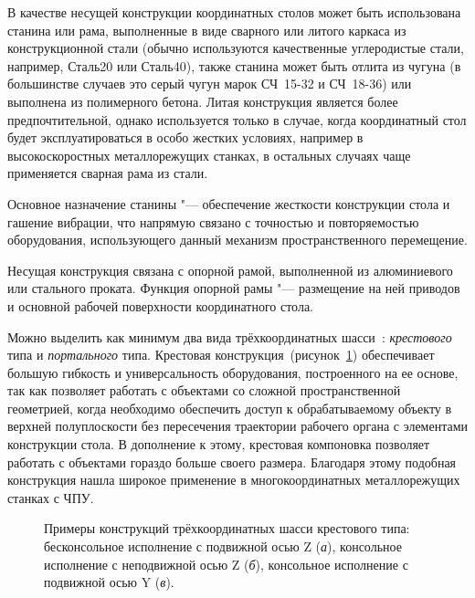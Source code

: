 В качестве несущей конструкции координатных столов может быть использована станина или рама, выполненные в виде сварного или литого каркаса из конструкционной стали (обычно используются качественные углеродистые стали, например, Сталь20 или Сталь40), также станина может быть отлита из чугуна (в большинстве случаев это серый чугун марок СЧ~15-32 и СЧ~18-36) или выполнена из полимерного бетона. Литая конструкция является более предпочтительной, однако используется только в случае, когда координатный стол будет эксплуатироваться в особо жестких условиях, например в высокоскоростных металлорежущих станках, в остальных случаях чаще применяется сварная рама из стали.

Основное назначение станины "--- обеспечение жесткости конструкции стола и гашение вибрации, что напрямую связано с точностью и повторяемостью оборудования, использующего данный механизм пространственного перемещение.

Несущая конструкция связана с опорной рамой, выполненной из алюминиевого или стального проката. Функция опорной рамы "--- размещение на ней приводов и основной рабочей поверхности координатного стола.

Можно выделить как минимум два вида трёхкоординатных шасси~\cite{yang2013generalized, yang2015position}: \textit{крестового} типа и \textit{портального} типа. Крестовая конструкция~(рисунок~\cref{fig:cross}) обеспечивает большую гибкость и универсальность оборудования, построенного на ее основе, так как позволяет работать с объектами со сложной пространственной геометрией, когда необходимо обеспечить доступ к обрабатываемому объекту в верхней полуплоскости без пересечения траектории рабочего органа с элементами конструкции стола. В дополнение к этому, крестовая компоновка позволяет работать с объектами гораздо больше своего размера. Благодаря этому подобная конструкция нашла широкое применение в многокоординатных металлорежущих станках с ЧПУ.

\begin{figure}[ht]
	\caption[Примеры конструкций трёхкоординатных шасси крестового типа с подвижным порталом]%
	{Примеры конструкций трёхкоординатных шасси крестового типа: бесконсольное исполнение с подвижной осью Z (\textit{а}), консольное исполнение с неподвижной осью Z  (\textit{б}), консольное исполнение с подвижной осью Y (\textit{в}).}\label{fig:cross}
\end{figure}

